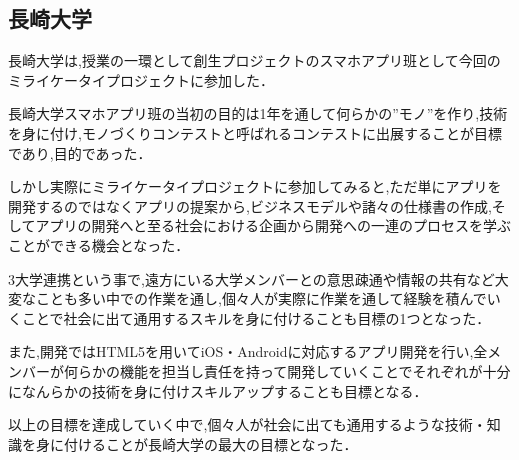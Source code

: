 \subsection{長崎大学}
\par
長崎大学は,授業の一環として創生プロジェクトのスマホアプリ班として今回のミライケータイプロジェクトに参加した．
\par
長崎大学スマホアプリ班の当初の目的は1年を通して何らかの”モノ”を作り,技術を身に付け,モノづくりコンテストと呼ばれるコンテストに出展することが目標であり,目的であった．
\par
しかし実際にミライケータイプロジェクトに参加してみると,ただ単にアプリを開発するのではなくアプリの提案から,ビジネスモデルや諸々の仕様書の作成,そしてアプリの開発へと至る社会における企画から開発への一連のプロセスを学ぶことができる機会となった．
\par
3大学連携という事で,遠方にいる大学メンバーとの意思疎通や情報の共有など大変なことも多い中での作業を通し,個々人が実際に作業を通して経験を積んでいくことで社会に出て通用するスキルを身に付けることも目標の1つとなった．
\par
また,開発ではHTML5を用いてiOS・Androidに対応するアプリ開発を行い,全メンバーが何らかの機能を担当し責任を持って開発していくことでそれぞれが十分になんらかの技術を身に付けスキルアップすることも目標となる．
\par
以上の目標を達成していく中で,個々人が社会に出ても通用するような技術・知識を身に付けることが長崎大学の最大の目標となった．
